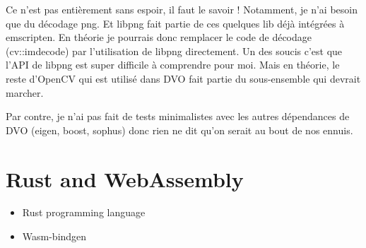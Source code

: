 Ce n’est pas entièrement sans espoir, il faut le savoir ! Notamment, je n’ai besoin que du décodage png. Et libpng fait partie de ces quelques lib déjà intégrées à emscripten. En théorie je pourrais donc remplacer le code de décodage (cv::imdecode) par l’utilisation de libpng directement. Un des soucis c’est que l’API de libpng est super difficile à comprendre pour moi. Mais en théorie, le reste d’OpenCV qui est utilisé dans DVO fait partie du sous-ensemble qui devrait marcher.

Par contre, je n’ai pas fait de tests minimalistes avec les autres dépendances de DVO (eigen, boost, sophus) donc rien ne dit qu’on serait au bout de nos ennuis.

\section{Rust and WebAssembly}%
\label{sec:rust_wasm}

\begin{itemize}
	\item Rust programming language
	\item Wasm-bindgen
\end{itemize}
